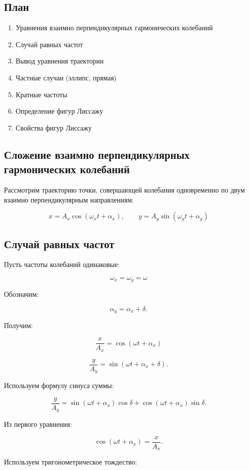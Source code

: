 \documentclass[a4paper,12pt]{article}
\begin{document}
\subsection*{План}
\begin{enumerate}
\item Уравнения взаимно перпендикулярных гармонических колебаний
\item Случай равных частот
\item Вывод уравнения траектории
\item Частные случаи (эллипс, прямая)
\item Кратные частоты
\item Определение фигур Лиссажу
\item Свойства фигур Лиссажу
\end{enumerate}

\subsection*{Сложение взаимно перпендикулярных гармонических колебаний}

Рассмотрим траекторию точки, совершающей колебания одновременно по двум взаимно перпендикулярным направлениям:

\[
x = A_x \cos(\omega_x t + \alpha_x),
\qquad
y = A_y \sin(\omega_y t + \alpha_y)
\]  

\subsection*{Случай равных частот}

Пусть частоты колебаний одинаковые:

\[
\omega_x = \omega_y = \omega
\]

Обозначим:

\[
\alpha_y = \alpha_x + \delta.
\]

Получим:

\[
\frac{x}{A_x} = \cos(\omega t + \alpha_x)
\]

\[
\frac{y}{A_y} = \sin(\omega t + \alpha_x + \delta).
\]

Используем формулу синуса суммы:  

\[
\frac{y}{A_y}
=
\sin(\omega t + \alpha_x)\cos\delta
+
\cos(\omega t + \alpha_x)\sin\delta.
\]

Из первого уравнения:

\[
\cos(\omega t + \alpha_x) = \frac{x}{A_x}.
\]

Используем тригонометрическое тождество: 
\end{document}
